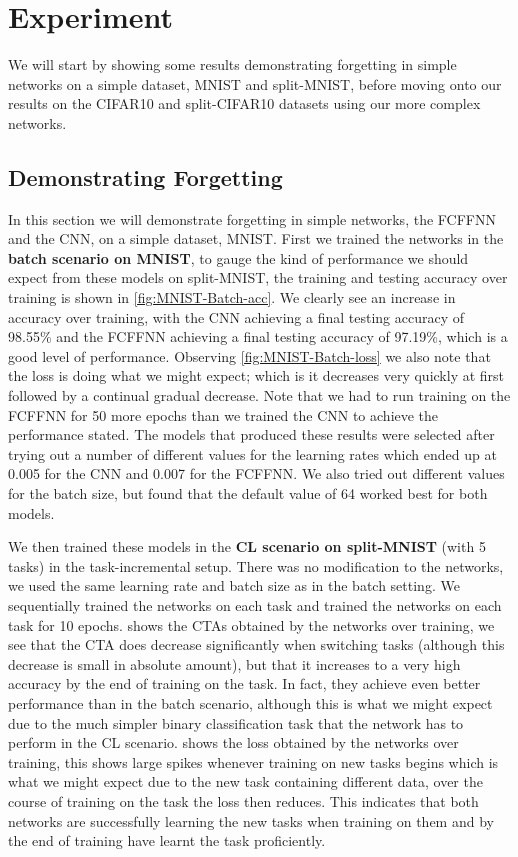\section{Experiment}
\label{sec:experiment}
We will start by showing some results demonstrating forgetting in simple networks on a simple dataset, MNIST and split-MNIST, before moving onto our results on the CIFAR10 and split-CIFAR10 datasets using our more complex networks. 

\subsection{Demonstrating Forgetting}
\label{sec:demo_forgetting}
In this section we will demonstrate forgetting in simple networks, the FCFFNN and the CNN, on a simple dataset, MNIST. First we trained the networks in the \textbf{batch scenario on MNIST}, to gauge the kind of performance we should expect from these models on split-MNIST, the training and testing accuracy over training is shown in \cref{fig:MNIST-Batch-acc}. We clearly see an increase in accuracy over training, with the CNN achieving a final testing accuracy of 98.55\% and the FCFFNN achieving a final testing accuracy of 97.19\%, which is a good level of performance. Observing \cref{fig:MNIST-Batch-loss} we also note that the loss is doing what we might expect; which is it decreases very quickly at first followed by a continual gradual decrease. Note that we had to run training on the FCFFNN for 50 more epochs than we trained the CNN to achieve the performance stated. The models that produced these results were selected after trying out a number of different values for the learning rates which ended up at 0.005 for the CNN and 0.007 for the FCFFNN. We also tried out different values for the batch size, but found that the default value of 64 worked best for both models. 

We then trained these models in the \textbf{CL scenario on split-MNIST} (with 5 tasks) in the task-incremental setup. There was no modification to the networks, we used the same learning rate and batch size as in the batch setting. We sequentially trained the networks on each task and trained the networks on each task for 10 epochs.  shows the CTAs obtained by the networks over training, we see that the CTA does decrease significantly when switching tasks (although this decrease is small in absolute amount), but that it increases to a very high accuracy by the end of training on the task. In fact, they achieve even better performance than in the batch scenario, although this is what we might expect due to the much simpler binary classification task that the network has to perform in the CL scenario.  shows the loss obtained by the networks over training, this shows large spikes whenever training on new tasks begins which is what we might expect due to the new task containing different data, over the course of training on the task the loss then reduces. This indicates that both networks are successfully learning the new tasks when training on them and by the end of training have learnt the task proficiently.

